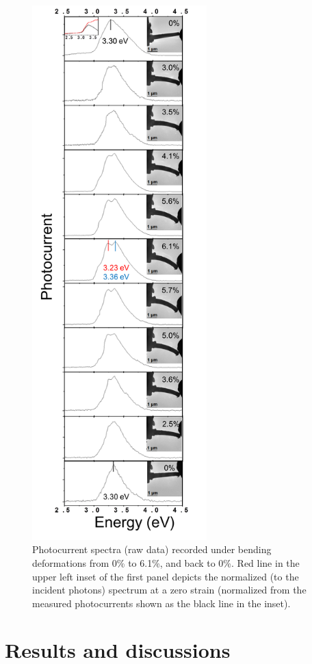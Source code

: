 \begin{figure}  
\includegraphics[width=191pt]{figures/figure5_2}
\centering
\caption[Splitting of photocurrent spectra]{Photocurrent spectra (raw data) recorded under bending deformations from 0\% to 6.1\%, and back to 0\%. Red line in the upper left inset of the first panel depicts the normalized (to the incident photons) spectrum at a zero strain (normalized from the measured photocurrents shown as the black line in the inset).
\label{fig:5_2}}
\end{figure}

\section{Results and discussions}

